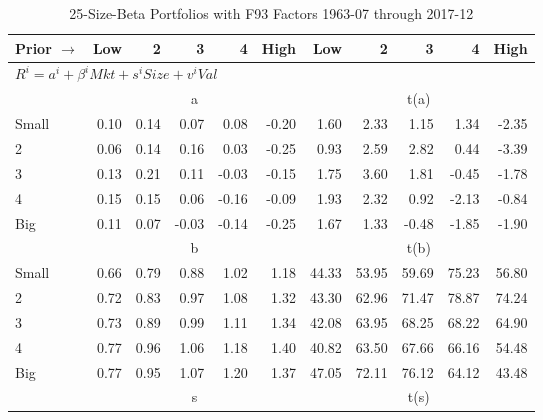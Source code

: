 
\begin{table}[!ht]
\footnotesize
\centering
\caption{25-Size-Beta Portfolios with F93 Factors 1963-07 through 2017-12}
\begin{tabular}{lrrrrrrrrrr}
  \toprule
    Prior $\rightarrow$ & Low & 2 & 3 & 4 & High & Low & 2 & 3 & 4 & High \\ 
  \midrule
  \multicolumn{11}{l}{$R^i=a^i+\beta^iMkt+s^iSize+v^iVal$} \\

  
    
      & \multicolumn{5}{c}{a} & \multicolumn{5}{c}{t(a)}
    
    \\
      \cmidrule(r){2-6} \cmidrule(r){7-11}

    Small   & 0.10  & 0.14  & 0.07  & 0.08  & -0.20  & 1.60  & 2.33  & 1.15  & 1.34  & -2.35  \\
         2  & 0.06  & 0.14  & 0.16  & 0.03  & -0.25  & 0.93  & 2.59  & 2.82  & 0.44  & -3.39  \\
         3  & 0.13  & 0.21  & 0.11  & -0.03  & -0.15  & 1.75  & 3.60  & 1.81  & -0.45  & -1.78  \\
         4  & 0.15  & 0.15  & 0.06  & -0.16  & -0.09  & 1.93  & 2.32  & 0.92  & -2.13  & -0.84  \\
    Big     & 0.11  & 0.07  & -0.03  & -0.14  & -0.25  & 1.67  & 1.33  & -0.48  & -1.85  & -1.90  \\

  
    
      & \multicolumn{5}{c}{b} & \multicolumn{5}{c}{t(b)}
    
    \\
      \cmidrule(r){2-6} \cmidrule(r){7-11}

    Small   & 0.66  & 0.79  & 0.88  & 1.02  & 1.18  & 44.33  & 53.95  & 59.69  & 75.23  & 56.80  \\
         2  & 0.72  & 0.83  & 0.97  & 1.08  & 1.32  & 43.30  & 62.96  & 71.47  & 78.87  & 74.24  \\
         3  & 0.73  & 0.89  & 0.99  & 1.11  & 1.34  & 42.08  & 63.95  & 68.25  & 68.22  & 64.90  \\
         4  & 0.77  & 0.96  & 1.06  & 1.18  & 1.40  & 40.82  & 63.50  & 67.66  & 66.16  & 54.48  \\
    Big     & 0.77  & 0.95  & 1.07  & 1.20  & 1.37  & 47.05  & 72.11  & 76.12  & 64.12  & 43.48  \\

  
    
      & \multicolumn{5}{c}{s} & \multicolumn{5}{c}{t(s)}
    

\end{tabular}
\end{table}
